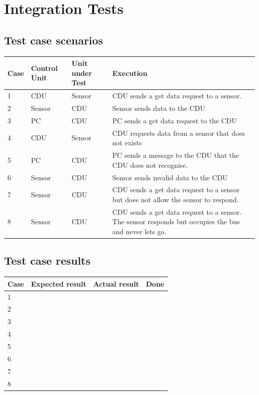 \chapter{Integration Tests}

\section{Test case scenarios}
\begin{table}[H]
    \begin{tabular}{|l|l|l|p{10cm}|}
    \hline
    Case & Control Unit & Unit under Test & Execution \\ \hline
    1 & CDU & Sensor & CDU sends a get data request to a sensor. \\ \hline
    2 & Sensor & CDU & Sensor sends data to the CDU \\ \hline
    3 & PC & CDU & PC sends a get data request to the CDU \\ \hline
    4 & CDU & Sensor & CDU requests data from a sensor that does not exists \\ \hline
    5 & PC & CDU & PC sends a message to the CDU that the CDU does not recognise. \\ \hline
    6 & Sensor & CDU & Sensor sends invalid data to the CDU \\ \hline
    7 & Sensor & CDU & CDU sends a get data request to a sensor but does not allow the sensor to respond. \\ \hline
    8 & Sensor & CDU & CDU sends a get data request to a sensor. The sensor responds but occupies the bus and never lets go. \\ \hline
    \end{tabular}
\end{table}

\section{Test case results}
\begin{table}[H]
    \begin{tabular}{|l|l|l|p{10cm}|}
    \hline
    Case & Expected result & Actual result & Done \\ \hline
    1 & ~ & ~ & ~\\ \hline
    2 & ~ & ~ & ~\\ \hline
    3 & ~ & ~ & ~\\ \hline
    4 & ~ & ~ & ~\\ \hline
    5 & ~ & ~ & ~\\ \hline
    6 & ~ & ~ & ~\\ \hline
    7 & ~ & ~ & ~\\ \hline
    8 & ~ & ~ & ~\\ \hline
    \end{tabular}
\end{table}

